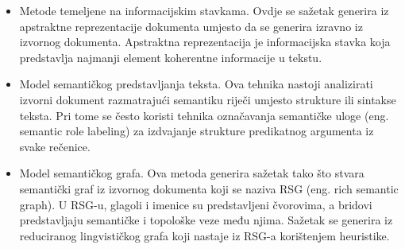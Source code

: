\documentclass[times, utf8, zavrsni, numeric]{fer}
\begin{document}
\begin{itemize}
    \item Metode temeljene na informacijskim stavkama. Ovdje se sažetak generira iz apstraktne reprezentacije dokumenta umjesto da se generira izravno iz izvornog dokumenta. Apstraktna reprezentacija je informacijska stavka koja predstavlja najmanji element koherentne informacije u tekstu.
    \item Model semantičkog predstavljanja teksta. Ova tehnika nastoji analizirati izvorni dokument razmatrajući semantiku riječi umjesto strukture ili sintakse teksta. Pri tome se često koristi tehnika označavanja semantičke uloge (eng. semantic role labeling) za izdvajanje strukture predikatnog argumenta iz svake rečenice.
    \item Model semantičkog grafa. Ova metoda generira sažetak tako što stvara semantički graf iz izvornog dokumenta koji se naziva RSG (eng. rich semantic graph). U RSG-u, glagoli i imenice su predstavljeni čvorovima, a bridovi predstavljaju semantičke i topološke veze među njima. Sažetak se generira iz reduciranog lingvističkog grafa koji nastaje iz RSG-a korištenjem heuristike.
 \end{itemize}
\end{document}
